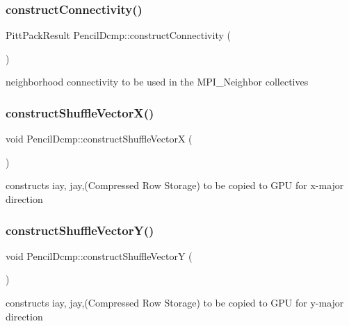 \subsubsection{\texorpdfstring{construct\+Connectivity()}{constructConnectivity()}}
{\footnotesize\ttfamily Pitt\+Pack\+Result Pencil\+Dcmp\+::construct\+Connectivity (\begin{DoxyParamCaption}{ }\end{DoxyParamCaption})}

neighborhood connectivity to be used in the M\+P\+I\+\_\+\+Neighbor collectives \mbox{\label{classPencilDcmp_a2076e314ec80c355137c743450c31d0b}} 
\subsubsection{\texorpdfstring{construct\+Shuffle\+Vector\+X()}{constructShuffleVectorX()}}
{\footnotesize\ttfamily void Pencil\+Dcmp\+::construct\+Shuffle\+VectorX (\begin{DoxyParamCaption}{ }\end{DoxyParamCaption})}

constructs iay, jay,(Compressed Row Storage) to be copied to G\+PU for x-\/major direction \mbox{\label{classPencilDcmp_a41667d2540bb3f3435acd5f5af7db2e4}} 
\subsubsection{\texorpdfstring{construct\+Shuffle\+Vector\+Y()}{constructShuffleVectorY()}}
{\footnotesize\ttfamily void Pencil\+Dcmp\+::construct\+Shuffle\+VectorY (\begin{DoxyParamCaption}{ }\end{DoxyParamCaption})}

constructs iay, jay,(Compressed Row Storage) to be copied to G\+PU for y-\/major direction \mbox{\label{classPencilDcmp_a6cdc6f82cdbf5ee0ee8e1da2810ed5b3}} 
